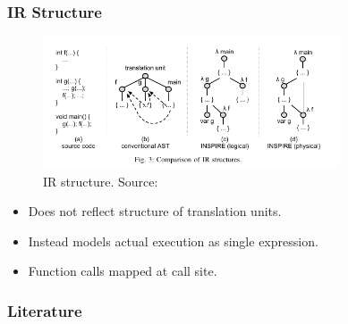 \documentclass{beamer}
\begin{document}
\begin{frame}
\frametitle{IR Structure}

\begin{figure}
\centering
\includegraphics[width=250pt]{structure}
\caption{IR structure. Source: \cite{JordanPTKF13}}
\end{figure}

\begin{itemize}
\item Does not reflect structure of translation units. 

\item Instead models actual execution as single expression. 

\item Function calls mapped at call site. 
\end{itemize}
\end{frame}

\begin{frame}[allowframebreaks]
\frametitle<presentation>{Literature}    
\printbibliography
\end{frame} 	 
\end{document}
